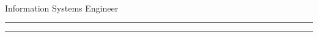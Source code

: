 \documentclass[10pt,a4paper]{article}
\begin{document}
\thispagestyle{empty}

\begin{flushright}
    \huge{\textbf{\name}} \\
    \large{Information Systems Engineer}
\end{flushright}
\hrule
\bigskip



\bigskip
\hrule
\end{document}
